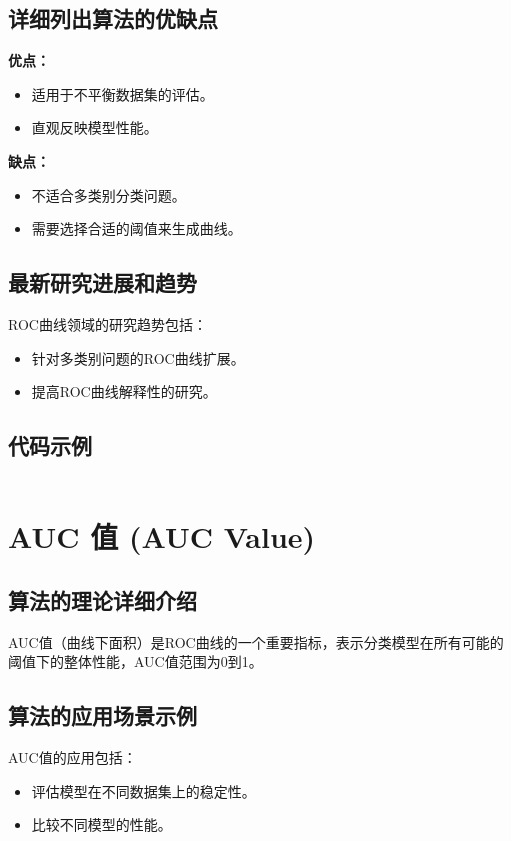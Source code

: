 \subsection*{详细列出算法的优缺点}
\textbf{优点：}
\begin{itemize}
    \item 适用于不平衡数据集的评估。
    \item 直观反映模型性能。
\end{itemize}

\textbf{缺点：}
\begin{itemize}
    \item 不适合多类别分类问题。
    \item 需要选择合适的阈值来生成曲线。
\end{itemize}

\subsection*{最新研究进展和趋势}
ROC曲线领域的研究趋势包括：
\begin{itemize}
    \item 针对多类别问题的ROC曲线扩展。
    \item 提高ROC曲线解释性的研究。
\end{itemize}
\subsection*{代码示例}
\begin{lstlisting}

\end{lstlisting}


\section{AUC 值 (AUC Value)}
\subsection*{算法的理论详细介绍}
AUC值（曲线下面积）是ROC曲线的一个重要指标，表示分类模型在所有可能的阈值下的整体性能，AUC值范围为0到1。

\subsection*{算法的应用场景示例}
AUC值的应用包括：
\begin{itemize}
    \item 评估模型在不同数据集上的稳定性。
    \item 比较不同模型的性能。
\end{itemize}

